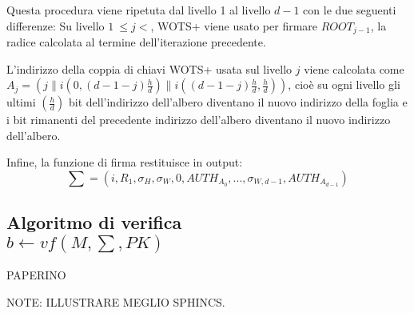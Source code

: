 Questa procedura viene ripetuta dal livello 1 al livello \(d - 1\) con le due seguenti differenze: Su livello \( 1 \ \leqslant j < \), WOTS+ viene usato per firmare \(ROOT_{j-1}\), la radice calcolata al termine dell'iterazione precedente.

L'indirizzo della coppia di chiavi WOTS+ usata sul livello \(j\) viene calcolata come \( A_j = (j\|i(0, (d - 1 - j)\frac{h}{d})\|i((d - 1 - j)\frac{h}{d}, \frac{h}{d})) \), cioè su ogni livello gli ultimi \((\frac{h}{d})\) bit dell'indirizzo dell'albero diventano il nuovo indirizzo della foglia e i bit rimanenti del precedente indirizzo dell'albero diventano il nuovo indirizzo dell'albero.

Infine, la funzione di firma restituisce in output:
\[ \sum = (i, R_1, \sigma_H, \sigma_W,0, AUTH_{A_0} , . . . , \sigma_{W,d-1}, AUTH_{A_{d-1}} ) \]

\subsection{Algoritmo di verifica\\\(b \leftarrow vf(M, \sum, PK)\)}
PAPERINO


NOTE: ILLUSTRARE MEGLIO SPHINCS.